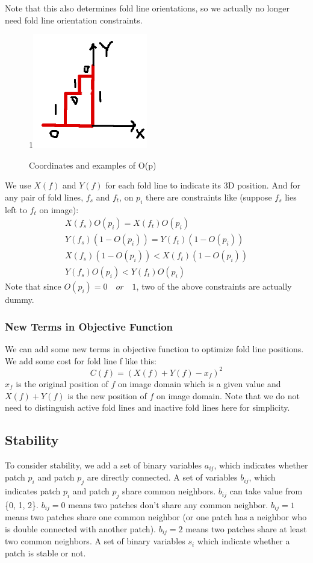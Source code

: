\documentclass{article}
\begin{document}
Note that this also determines fold line orientations, so we actually no longer need fold line orientation constraints.

\color{black}

\begin{figure}[h]
  1\includegraphics[width = 5cm, height = 5cm]{Figures/coordinates}
  \caption{Coordinates and examples of O(p)}
  \label{fig: Coordinates}
\end{figure}

We use $X(f)$ and $Y(f)$ for each fold line to indicate its 3D position. And for any pair of fold lines, $f_s$ and $f_t$, on $p_i$ there are constraints like (suppose $f_s$ lies left to $f_t$ on image):
\begin{multline}
  X(f_s)O(p_i) = X(f_t)O(p_i)\\
  Y(f_s)(1 - O(p_i)) = Y(f_t)(1 - O(p_i))\\
  X(f_s)(1 - O(p_i)) < X(f_t)(1 - O(p_i))\\
  Y(f_s)O(p_i) < Y(f_t)O(p_i)
\end{multline}
Note that since $O(p_i) = 0 \quad or \quad 1$, two of the above constraints are actually dummy.

\subsubsection{New Terms in Objective Function}
We can add some new terms in objective function to optimize fold line positions. We add some cost for fold line f like this:
\begin{equation}
  C(f) = (X(f) + Y(f) - x_f)^2
\end{equation}
$x_f$ is the original position of $f$ on image domain which is a given value and $X(f) + Y(f)$ is the new position of $f$ on image domain. Note that we do not need to distinguish active fold lines and inactive fold lines here for simplicity.

\subsection{Stability}
To consider stability, we add a set of binary variables $a_{ij}$, which indicates whether patch $p_i$ and patch $p_j$ are directly connected. A set of variables $b_{ij}$, which indicates patch $p_i$ and patch $p_j$ share common neighbors. $b_{ij}$ can take value from \{0, 1, 2\}. $b_{ij} = 0$ means two patches don't share any common neighbor. $b_{ij} = 1$ means two patches share one common neighbor (or one patch has a neighbor who is double connected with another patch). $b_{ij} = 2$ means two patches share at least two common neighbors. A set of binary variables $s_{i}$ which indicate whether a patch is stable or not.
\end{document}
